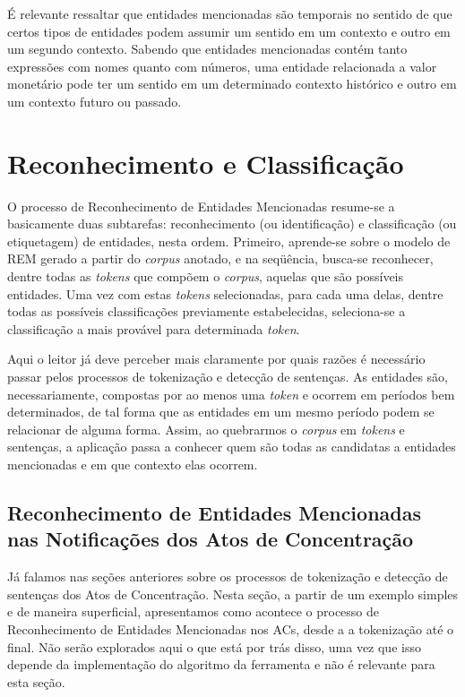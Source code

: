 \documentclass[11pt]{report}
\begin{document}
É relevante ressaltar que entidades mencionadas são temporais no sentido de que certos tipos de entidades podem assumir um sentido em um contexto e outro em um segundo contexto.
Sabendo que entidades mencionadas contém tanto expressões com nomes quanto com números, uma entidade relacionada a valor monetário pode ter um sentido em um determinado
contexto histórico e outro em um contexto futuro ou passado.

\section{Reconhecimento e Classificação}

\indent\indent O processo de Reconhecimento de Entidades Mencionadas resume-se a basicamente duas subtarefas: reconhecimento (ou identificação) e classificação (ou etiquetagem)
de entidades, nesta ordem. Primeiro, aprende-se sobre o modelo de REM gerado a partir do \textit{corpus} anotado, e na seqüência, busca-se reconhecer, dentre todas as \textit{tokens}
que compõem o \textit{corpus}, aquelas que são possíveis entidades. Uma vez com estas \textit{tokens} selecionadas, para cada uma delas, dentre todas as possíveis classificações
previamente estabelecidas, seleciona-se a classificação a mais provável para determinada \textit{token}.

Aqui o leitor já deve perceber mais claramente por quais razões é necessário passar pelos processos de tokenização e detecção de sentenças. As entidades são, necessariamente,
compostas por ao menos uma \textit{token} e ocorrem em períodos bem determinados, de tal forma que as entidades em um mesmo período podem se relacionar de alguma forma. Assim,
ao quebrarmos o \textit{corpus} em \textit{tokens} e sentenças, a aplicação passa a conhecer quem são todas as candidatas a entidades mencionadas e em que contexto elas ocorrem.

\subsection{Reconhecimento de Entidades Mencionadas nas Notificações dos Atos de Concentração}

\indent\indent Já falamos nas seções anteriores sobre os processos de tokenização e detecção de sentenças dos Atos de Concentração. Nesta seção, a partir de um exemplo simples e
de maneira superficial, apresentamos como acontece o processo de Reconhecimento de Entidades Mencionadas nos ACs, desde a a tokenização até o final. Não serão explorados aqui
o que está por trás disso, uma vez que isso depende da implementação do algoritmo da ferramenta e não é relevante para esta seção.
\end{document}
